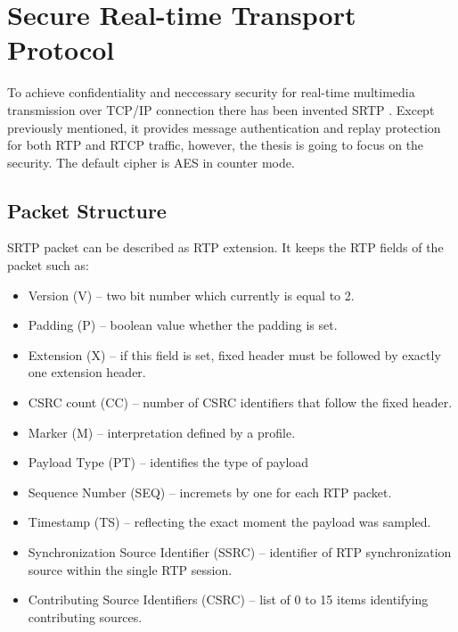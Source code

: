 
\chapter{Secure Real-time Transport Protocol}
To achieve confidentiality and neccessary security for real-time multimedia
transmission over TCP/IP connection there has been invented SRTP
\cite{rfc3711}. Except previously mentioned, it provides message
authentication and replay protection for both RTP and RTCP traffic, 
however, the thesis is going to focus on the security. The default cipher is AES
in counter mode.

\section{Packet Structure}
SRTP packet can be described as RTP extension. It keeps the RTP fields of
the packet such as:
\begin{itemize}
\item Version (V) -- two bit number which currently is equal to 2.
\item Padding (P) -- boolean value whether the padding is set.
\item Extension (X) -- if this field is set, fixed header must be followed by
exactly one extension header.
\item CSRC count (CC) -- number of CSRC identifiers that follow the fixed header.
\item Marker (M) -- interpretation defined by a profile.
\item Payload Type (PT) -- identifies the type of payload
\item Sequence Number (SEQ) -- incremets by one for each RTP packet.
\item Timestamp (TS) -- reflecting the exact moment the payload was sampled.
\item Synchronization Source Identifier (SSRC) -- identifier of RTP synchronization 
source within the single RTP session.
\item Contributing Source Identifiers (CSRC) -- list of 0 to 15 items identifying
contributing sources.
\end{itemize}

